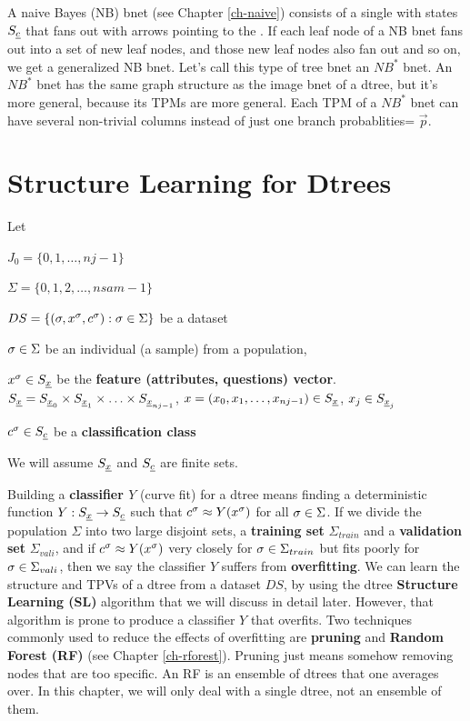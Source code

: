 A naive Bayes (NB) bnet 
(see Chapter \ref{ch-naive})
consists of a single 
with states $S_\rvc$ that fans
out with arrows 
pointing to the
.
If each leaf node
of a NB bnet
fans out into 
a set of new leaf
nodes, and those new
leaf nodes
also
fan out
and so on,
we get a 
generalized NB bnet.
Let's call
this type of tree bnet an $NB^*$ bnet.
An $NB^*$ bnet
has the same graph structure
as the image bnet of a dtree,
but it's more general,
because its 
TPMs are more general. 
Each 
TPM of a $NB^*$ bnet
 can have several non-trivial
columns instead of just one
branch probablities= $\vec{p}$.


\section{Structure Learning for  Dtrees}\label{sec-dtree-sl}



Let

$J_0=\{0,1, \ldots, nj-1\}$

$\Sigma=\{0,1,2, \ldots,nsam-1\}$

$DS=\{(\sigma, x^\sigma, c^\sigma): \sigma\in \Sigma\}$ be a dataset

$\sigma\in \Sigma$ be an individual (a sample)
from a population, 

$x^\s\in S_\rvx$ be the {\bf
feature (attributes, questions) vector}.
$S_\rvx= S_{\rvx_0}\times S_{\rvx_1}
\times\ldots\times S_{\rvx_{nj-1}}$,
$x=(x_0, x_1, \ldots, x_{nj-1})\in S_\rvx$, 
$x_j\in S_{\rvx_j}$


$c^\s\in S_\rvc$ be a {\bf classification class}

We will
assume $S_\rvx$ and $S_\rvc$ are finite sets.

Building a {\bf classifier $Y$} 
(curve fit) for a dtree means
finding a deterministic
function $Y:S_\rvx\rarrow S_\rvc$ 
such that 
$c^\sigma \approx Y(x^\sigma)$
for all $\sigma\in \Sigma$.
If we divide
the population
$\Sigma$ 
into two large 
disjoint
sets, a {\bf training set} $\Sigma_{train}$
and a {\bf validation set} $\Sigma_{vali}$,
and if $c^\sigma \approx Y(x^\sigma)$ very closely
for $\sigma\in \Sigma_{train}$
but fits poorly
for $\sigma\in \Sigma_{vali}$,
then we say the classifier  $Y$
suffers from {\bf overfitting}.
We can learn the structure
and TPVs of a dtree from a dataset $DS$,
by using the
dtree {\bf Structure Learning (SL)}
algorithm that we will 
discuss in detail later. However,
that algorithm
is prone to produce
a classifier $Y$ that overfits.
Two techniques 
commonly used to 
reduce the effects of overfitting
are {\bf pruning}  and 
{\bf Random Forest (RF)}
(see Chapter \ref{ch-rforest}).
Pruning just means somehow
removing nodes that are
too specific. 
An RF is an ensemble of dtrees 
that one averages over.
In this chapter, we will only deal
with a single dtree,
not an ensemble of them. 

